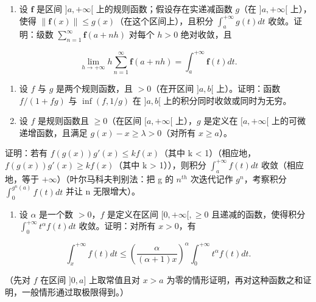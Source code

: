 \begin{enumerate}
\def\labelenumi{\arabic{enumi})}
\setcounter{enumi}{5}
\tightlist
\item
  设 \(\mathbf{f}\) 是区间 \(]a, +\infty[\) 上的规则函数；假设存在实递减函数 \(g\)（在 \(]a, +\infty[\) 上），使得 \(\| \mathbf{f}(x)\| \leqslant g(x)\)（在这个区间上），且积分 \(\int_{a}^{+\infty}g(t)dt\) 收敛。证明：级数 \(\sum_{n=1}^{\infty}\mathbf{f}(a + nh)\) 对每个 \(h > 0\) 绝对收敛，且
\end{enumerate}

\[
\lim _ {h \rightarrow + \infty} h \sum_ {n = 1} ^ {\infty} \mathbf {f} (a + n h) = \int_ {a} ^ {+ \infty} \mathbf {f} (t) d t.
\]

\begin{enumerate}
\def\labelenumi{\arabic{enumi})}
\setcounter{enumi}{6}
\item
  设 \(f\) 与 \(g\) 是两个规则函数，且 \(>0\)（在开区间 \(]a, b[\) 上）。证明：函数 \(f / (1 + fg)\) 与 \(\inf(f, 1/g)\) 在 \(]a, b[\) 上的积分同时收敛或同时为无穷。
\item
  设 \(f\) 是规则函数且 \(\geqslant 0\)（在区间 \([a, +\infty[\) 上），\(g\) 是定义在 \([a, +\infty[\) 上的可微递增函数，且满足 \(g(x) - x \geqslant \lambda > 0\)（对所有 \(x \geqslant a\)）。
\end{enumerate}

证明：若有 \(f(g(x))g'(x) \leqslant kf(x)\)（其中 k \textless{} 1）（相应地，\(f(g(x))g'(x) \geqslant kf(x)\)（其中 k \textgreater{} 1）），则积分 \(\int_{a}^{+\infty} f(t) dt\) 收敛（相应地，等于 \(+\infty\)）（叶尔马科夫判别法：把 g 的 \(n^{th}\) 次迭代记作 \(g^n\)，考察积分 \(\int_{0}^{g^n(a)} f(t) dt\) 并让 n 无限增大）。

\begin{enumerate}
\def\labelenumi{\arabic{enumi})}
\setcounter{enumi}{8}
\tightlist
\item
  设 \(\alpha\) 是一个数 \(>0\)，\(f\) 是定义在区间 \([0, +\infty[, \geqslant 0\) 且递减的函数，使得积分 \(\int_0^{+\infty} t^\alpha f(t) dt\) 收敛。证明：对所有 \(x > 0\)，有
\end{enumerate}

\[
\int_ {x} ^ {+ \infty} f (t) d t \leqslant \left(\frac {\alpha}{(\alpha + 1) x}\right) ^ {\alpha} \int_ {0} ^ {+ \infty} t ^ {\alpha} f (t) d t.
\]

（先对 \(f\) 在区间 \(]0, a]\) 上取常值且对 \(x > a\) 为零的情形证明，再对这种函数之和证明，一般情形通过取极限得到。）
